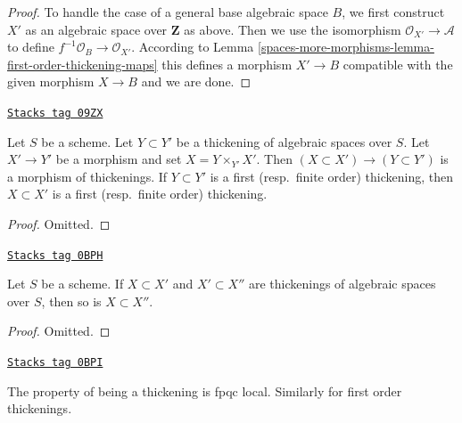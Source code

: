 \begin{proof}
\medskip\noindent
To handle the case of a general base algebraic space $B$, we first
construct $X'$ as an algebraic space over $\mathbf{Z}$ as above.
Then we use the isomorphism $\mathcal{O}_{X'} \to \mathcal{A}$ to
define $f^{-1}\mathcal{O}_B \to \mathcal{O}_{X'}$. According to
Lemma \ref{spaces-more-morphisms-lemma-first-order-thickening-maps}
this defines a morphism $X' \to B$ compatible with the given morphism
$X \to B$ and we are done.
\end{proof}

\begin{lemma}
\label{spaces-more-morphisms-lemma-base-change-thickening}
\href{https://stacks.math.columbia.edu/tag/09ZX}{\texttt{Stacks tag 09ZX}}

Let $S$ be a scheme. Let $Y \subset Y'$ be a thickening of algebraic spaces
over $S$. Let $X' \to Y'$ be a morphism and set $X = Y \times_{Y'} X'$.
Then $(X \subset X') \to (Y \subset Y')$
is a morphism of thickenings. If $Y \subset Y'$ is a first
(resp.\ finite order) thickening, then $X \subset X'$ is a first
(resp.\ finite order) thickening.
\end{lemma}

\begin{proof}
Omitted.
\end{proof}

\begin{lemma}
\label{spaces-more-morphisms-lemma-composition-thickening}
\href{https://stacks.math.columbia.edu/tag/0BPH}{\texttt{Stacks tag 0BPH}}

Let $S$ be a scheme. If $X \subset X'$ and $X' \subset X''$ are
thickenings of algebraic spaces over $S$, then so is $X \subset X''$.
\end{lemma}

\begin{proof}
Omitted.
\end{proof}

\begin{lemma}
\label{spaces-more-morphisms-lemma-descending-property-thickening}
\href{https://stacks.math.columbia.edu/tag/0BPI}{\texttt{Stacks tag 0BPI}}

The property of being a thickening is fpqc local.
Similarly for first order thickenings.
\end{lemma}

